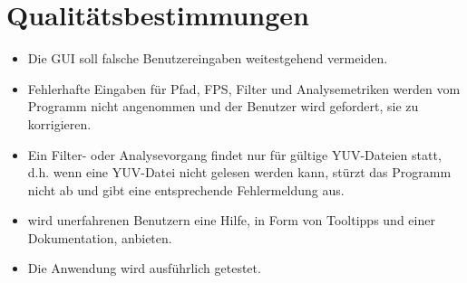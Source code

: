 \chapter{Qualitätsbestimmungen}

\begin{itemize}
\item Die GUI soll falsche Benutzereingaben weitestgehend vermeiden.
\item Fehlerhafte Eingaben für Pfad, FPS, Filter und Analysemetriken werden vom Programm nicht angenommen und der Benutzer wird gefordert, sie zu korrigieren.
\item Ein Filter- oder Analysevorgang findet nur für gültige YUV-Dateien statt, d.h. wenn eine YUV-Datei nicht gelesen werden kann, stürzt das Programm nicht ab und gibt eine entsprechende Fehlermeldung aus.
\item \projektTitel wird unerfahrenen Benutzern eine Hilfe, in Form von Tooltipps und einer Dokumentation, anbieten.
\item Die Anwendung wird ausführlich getestet.
\end{itemize}